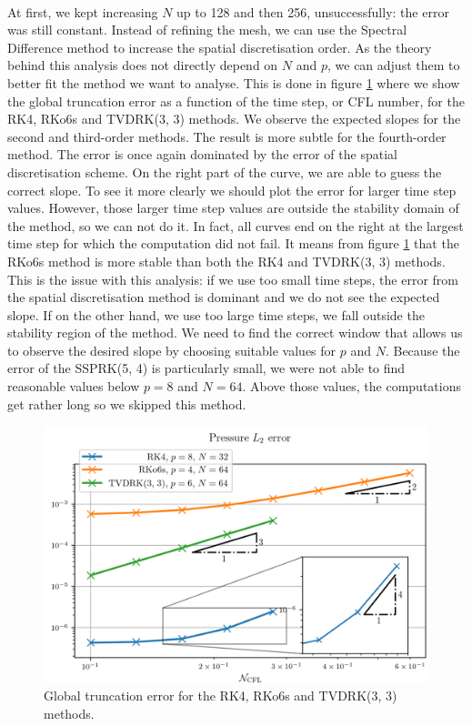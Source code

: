       \paragraph{}
      At first, we kept increasing $N$ up to 128 and then 256, unsuccessfully: the error was still constant.
      Instead of refining the mesh, we can use the Spectral Difference method to increase the spatial discretisation order.
      As the theory behind this analysis does not directly depend on $N$ and $p$, we can adjust them to better fit the method we want to analyse.
      This is done in figure \ref{fig:covo_rk} where we show the global truncation error as a function of the time step, or CFL number, for the RK4, RKo6s and TVDRK(3, 3) methods.
      We observe the expected slopes for the second and third-order methods.
      The result is more subtle for the fourth-order method.
      The error is once again dominated by the error of the spatial discretisation scheme.
      On the right part of the curve, we are able to guess the correct slope.
      To see it more clearly we should plot the error for larger time step values.
      However, those larger time step values are outside the stability domain of the method, so we can not do it.
      In fact, all curves end on the right at the largest time step for which the computation did not fail.
      It means from figure \ref{fig:covo_rk} that the RKo6s method is more stable than both the RK4 and TVDRK(3, 3) methods.
      This is the issue with this analysis: if we use too small time steps, the error from the spatial discretisation method is dominant and we do not see the expected slope.
      If on the other hand, we use too large time steps, we fall outside the stability region of the method.
      We need to find the correct window that allows us to observe the desired slope by choosing suitable values for $p$ and $N$.
      Because the error of the SSPRK(5, 4) is particularly small, we were not able to find reasonable values below $p = 8$ and $N = 64$.
      Above those values, the computations get rather long so we skipped this method.

      \begin{figure}
        \centering
        \includegraphics{figures/covo_rk.png}
        \caption{Global truncation error for the RK4, RKo6s and TVDRK(3, 3) methods.}
        \label{fig:covo_rk}
      \end{figure}

